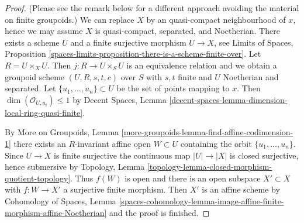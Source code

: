 \begin{proof}
(Please see the remark below for a different approach avoiding the material on
finite groupoids.) We can replace $X$ by an quasi-compact neighbourhood of
$x$, hence we may assume $X$ is quasi-compact, separated, and Noetherian.
There exists a scheme $U$ and a finite surjective morphism $U \to X$,
see Limits of Spaces, Proposition
\ref{spaces-limits-proposition-there-is-a-scheme-finite-over}.
Let $R = U \times_X U$. Then $j : R \to U \times_S U$ is an equivalence
relation and we obtain a groupoid scheme $(U, R, s, t, c)$ over $S$
with $s, t$ finite and $U$ Noetherian and separated.
Let $\{u_1, \ldots, u_n\} \subset U$ be the set of points mapping to $x$.
Then $\dim(\mathcal{O}_{U, u_i}) \leq 1$ by
Decent Spaces, Lemma
\ref{decent-spaces-lemma-dimension-local-ring-quasi-finite}.

\medskip\noindent
By More on Groupoids, Lemma
\ref{more-groupoids-lemma-find-affine-codimension-1}
there exists an $R$-invariant affine open $W \subset U$ containing
the orbit $\{u_1, \ldots, u_n\}$. Since $U \to X$ is finite surjective
the continuous map $|U| \to |X|$ is closed surjective, hence
submersive by Topology, Lemma
\ref{topology-lemma-closed-morphism-quotient-topology}.
Thus $f(W)$ is open and there is an open subspace $X' \subset X$
with $f : W \to X'$ a surjective finite morphism.
Then $X'$ is an affine scheme by
Cohomology of Spaces, Lemma
\ref{spaces-cohomology-lemma-image-affine-finite-morphism-affine-Noetherian}
and the proof is finished.
\end{proof}

